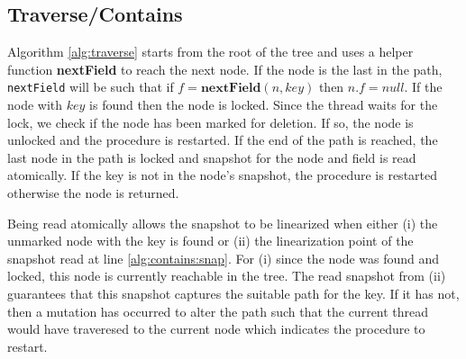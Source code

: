 \documentclass[11pt]{article}
\theoremstyle{definition}
\theoremstyle{theorem}
\begin{document}
\subsection{Traverse/Contains}
Algorithm \ref{alg:traverse} starts from the root of the tree and uses a helper function \textbf{nextField} to reach the next node. If the node is the last in the path, \texttt{nextField} will be such that if $f=\mathbf{nextField}(n, key)$ then $n.f = null$. If the node with $key$ is found then the node is locked. Since the thread waits for the lock, we check if the node has been marked for deletion. If so, the node is unlocked and the procedure is restarted. If the end of the path is reached, the last node in the path is locked and snapshot for the node and field is read atomically. If the key is not in the node's snapshot, the procedure is restarted otherwise the node is returned. 

Being read atomically allows the snapshot to be linearized when either (i) the unmarked node with the key is found or (ii) the linearization point of the snapshot read at line \ref{alg:contains:snap}. For (i) since the node was found and locked, this node is currently reachable in the tree. The read snapshot from (ii) guarantees  that this snapshot captures the suitable path for the key. If it has not, then a mutation has occurred to alter the path such that the current thread would have traveresed to the current node which indicates the procedure to restart.
\end{document}
